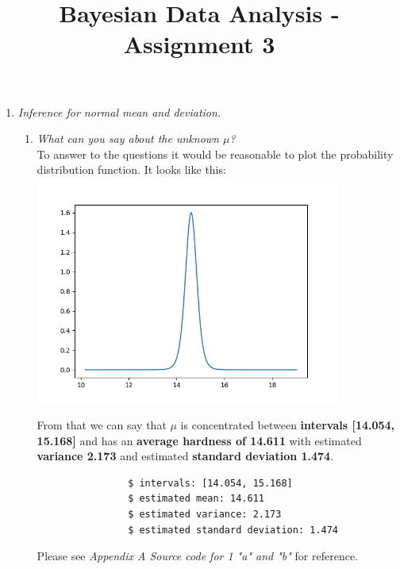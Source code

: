 \documentclass[11pt,a4paper,english]{article}
\title{Bayesian Data Analysis - Assignment 3}
\author{}
\begin{document}
      \maketitle

      \begin{enumerate}
        \item \textit{Inference for normal mean and deviation.}
          \begin{enumerate}[label=\alph*.]
            \item \textit{What can you say about the unknown $\mu$?}\\
              To answer to the questions it would be reasonable to plot the probability
              distribution function. It looks like this:\\
              \includegraphics[width=10cm]{3_1_a_mean_student_distribution.png}

              From that we can say that $\mu$ is concentrated between \textbf{intervals [14.054, 15.168]}
              and has an \textbf{average hardness of 14.611} with estimated \textbf{variance 2.173} and
              estimated \textbf{standard deviation 1.474}.

              \begin{verbatim}
                $ intervals: [14.054, 15.168]
                $ estimated mean: 14.611
                $ estimated variance: 2.173
                $ estimated standard deviation: 1.474
              \end{verbatim}
              Please see \textit{Appendix A Source code for 1 "a" and "b"} for reference.


\end{enumerate}
\end{enumerate}
\end{document}
